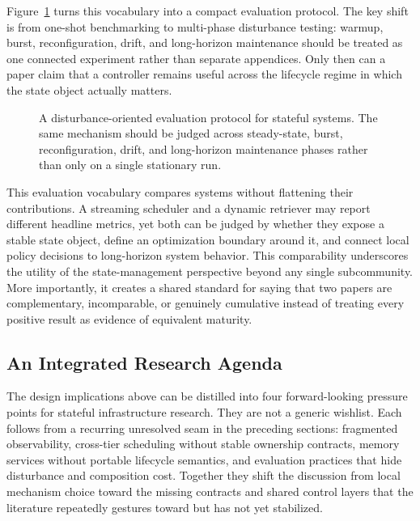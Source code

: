 \documentclass[acmsmall,screen,review]{acmart}
\begin{document}
Figure~\ref{fig:disturbance-protocol} turns this vocabulary into a compact evaluation protocol. The key shift is from one-shot benchmarking to multi-phase disturbance testing: warmup, burst, reconfiguration, drift, and long-horizon maintenance should be treated as one connected experiment rather than separate appendices. Only then can a paper claim that a controller remains useful across the lifecycle regime in which the state object actually matters.

\begin{figure}[t]
\centering
\resizebox{0.94\textwidth}{!}{}
\caption{A disturbance-oriented evaluation protocol for stateful systems. The same mechanism should be judged across steady-state, burst, reconfiguration, drift, and long-horizon maintenance phases rather than only on a single stationary run.}
\label{fig:disturbance-protocol}
\end{figure}

This evaluation vocabulary compares systems without flattening their contributions. A streaming scheduler and a dynamic retriever may report different headline metrics, yet both can be judged by whether they expose a stable state object, define an optimization boundary around it, and connect local policy decisions to long-horizon system behavior. This comparability underscores the utility of the state-management perspective beyond any single subcommunity. More importantly, it creates a shared standard for saying that two papers are complementary, incomparable, or genuinely cumulative instead of treating every positive result as evidence of equivalent maturity.

\subsection{An Integrated Research Agenda}

The design implications above can be distilled into four forward-looking pressure points for stateful infrastructure research. They are not a generic wishlist. Each follows from a recurring unresolved seam in the preceding sections: fragmented observability, cross-tier scheduling without stable ownership contracts, memory services without portable lifecycle semantics, and evaluation practices that hide disturbance and composition cost. Together they shift the discussion from local mechanism choice toward the missing contracts and shared control layers that the literature repeatedly gestures toward but has not yet stabilized.
\end{document}
